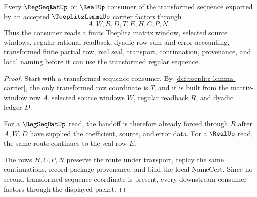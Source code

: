 \begin{theorem}\label{thm:toeplitz-lemma-regular-sequence-handoff}
Every $\RegSeqRatUp$ or $\RealUp$ consumer of the transformed sequence exported by an accepted $\ToeplitzLemmaUp$ carrier factors through
$$
A,W,R,D,T,E,H,C,P,N.
$$
Thus the consumer reads a finite Toeplitz matrix window, selected source windows, regular rational readback, dyadic row-sum and error accounting, transformed finite partial row, real seal, transport, continuation, provenance, and local naming before it can use the transformed regular sequence.
\end{theorem}
\begin{proof}
Start with a transformed-sequence consumer. By \autoref{def:toeplitz-lemma-carrier}, the only transformed row coordinate is $T$, and it is built from the matrix-window row $A$, selected source windows $W$, regular readback $R$, and dyadic ledger $D$.

For a $\RegSeqRatUp$ read, the handoff is therefore already forced through $R$ after $A,W,D$ have supplied the coefficient, source, and error data. For a $\RealUp$ read, the same route continues to the seal row $E$.

The rows $H,C,P,N$ preserve the route under transport, replay the same continuations, record package provenance, and bind the local NameCert. Since no second transformed-sequence coordinate is present, every downstream consumer factors through the displayed packet.
\end{proof}

